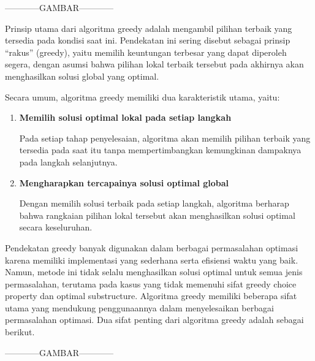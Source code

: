 \documentclass{article}
\begin{document}
------------GAMBAR------------

Prinsip utama dari algoritma greedy adalah mengambil pilihan terbaik yang tersedia pada kondisi 
saat ini. Pendekatan ini sering disebut sebagai prinsip ``rakus'' (greedy), yaitu memilih keuntungan 
terbesar yang dapat diperoleh segera, dengan asumsi bahwa pilihan lokal terbaik tersebut pada 
akhirnya akan menghasilkan solusi global yang optimal.

Secara umum, algoritma greedy memiliki dua karakteristik utama, yaitu:

\begin{enumerate}[label=\alph*.]
\item \textbf{Memilih solusi optimal lokal pada setiap langkah}  

Pada setiap tahap penyelesaian, algoritma akan memilih pilihan terbaik yang tersedia pada saat itu tanpa mempertimbangkan kemungkinan dampaknya pada langkah selanjutnya.

\item \textbf{Mengharapkan tercapainya solusi optimal global}  

Dengan memilih solusi terbaik pada setiap langkah, algoritma berharap bahwa rangkaian pilihan lokal tersebut akan menghasilkan solusi optimal secara keseluruhan.
\end{enumerate}

Pendekatan greedy banyak digunakan dalam berbagai permasalahan optimasi karena memiliki 
implementasi yang sederhana serta efisiensi waktu yang baik. Namun, metode ini tidak selalu 
menghasilkan solusi optimal untuk semua jenis permasalahan, terutama pada kasus yang tidak memenuhi 
sifat greedy choice property dan optimal substructure.
Algoritma greedy memiliki beberapa sifat utama yang mendukung penggunaannya dalam menyelesaikan 
berbagai permasalahan optimasi. Dua sifat penting dari algoritma greedy adalah sebagai berikut.

------------GAMBAR------------
\end{document}
